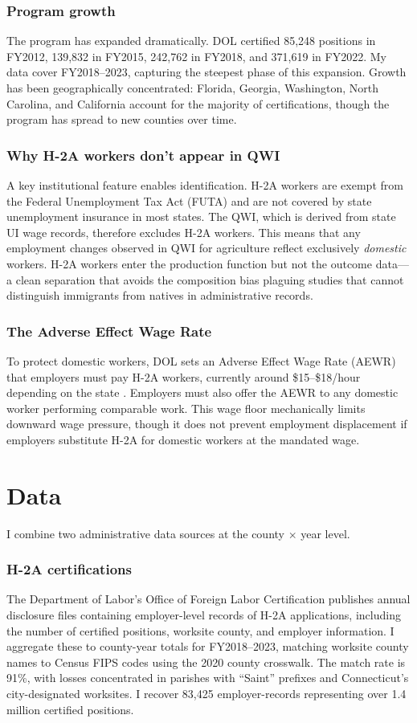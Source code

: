 \documentclass[12pt]{article}
\begin{document}
\subsubsection*{Program growth} The program has expanded dramatically. DOL certified 85,248 positions in FY2012, 139,832 in FY2015, 242,762 in FY2018, and 371,619 in FY2022. My data cover FY2018--2023, capturing the steepest phase of this expansion. Growth has been geographically concentrated: Florida, Georgia, Washington, North Carolina, and California account for the majority of certifications, though the program has spread to new counties over time.

\subsubsection*{Why H-2A workers don't appear in QWI} A key institutional feature enables identification. H-2A workers are exempt from the Federal Unemployment Tax Act (FUTA) and are not covered by state unemployment insurance in most states. The QWI, which is derived from state UI wage records, therefore excludes H-2A workers. This means that any employment changes observed in QWI for agriculture reflect exclusively \textit{domestic} workers. H-2A workers enter the production function but not the outcome data---a clean separation that avoids the composition bias plaguing studies that cannot distinguish immigrants from natives in administrative records.

\subsubsection*{The Adverse Effect Wage Rate} To protect domestic workers, DOL sets an Adverse Effect Wage Rate (AEWR) that employers must pay H-2A workers, currently around \$15--\$18/hour depending on the state \citep{DOL2023}. Employers must also offer the AEWR to any domestic worker performing comparable work. This wage floor mechanically limits downward wage pressure, though it does not prevent employment displacement if employers substitute H-2A for domestic workers at the mandated wage.

\section{Data}

I combine two administrative data sources at the county $\times$ year level.

\subsubsection*{H-2A certifications} The Department of Labor's Office of Foreign Labor Certification publishes annual disclosure files containing employer-level records of H-2A applications, including the number of certified positions, worksite county, and employer information. I aggregate these to county-year totals for FY2018--2023, matching worksite county names to Census FIPS codes using the 2020 county crosswalk. The match rate is 91\%, with losses concentrated in parishes with ``Saint'' prefixes and Connecticut's city-designated worksites. I recover 83,425 employer-records representing over 1.4 million certified positions.
\end{document}
